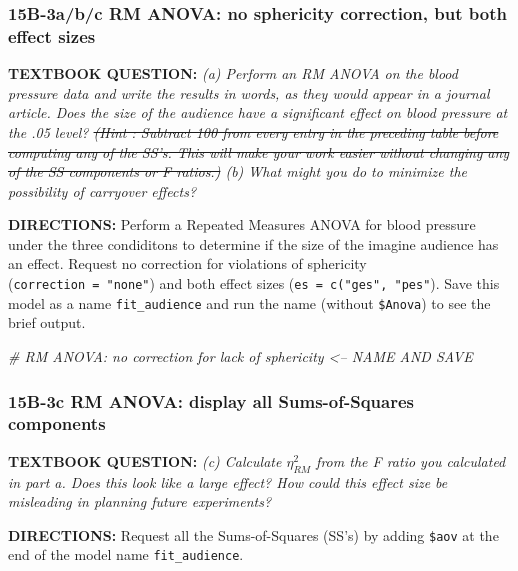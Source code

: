 \documentclass[]{article}
\newenvironment{Shaded}{\begin{snugshade}}{\end{snugshade}}
\newcommand{\CommentTok}[1]{\textcolor[rgb]{0.56,0.35,0.01}{\textit{#1}}}
\begin{document}
\clearpage

\subsubsection{15B-3a/b/c RM ANOVA: no sphericity correction, but both
effect
sizes}\label{b-3abc-rm-anova-no-sphericity-correction-but-both-effect-sizes}

\textbf{TEXTBOOK QUESTION:} \emph{(a) Perform an RM ANOVA on the blood
pressure data and write the results in words, as they would appear in a
journal article. Does the size of the audience have a significant effect
on blood pressure at the .05 level? \sout{(Hint : Subtract 100 from
every entry in the preceding table before computing any of the SS's.
This will make your work easier without changing any of the SS
components or F ratios.)} (b) What might you do to minimize the
possibility of carryover effects?}

\textbf{DIRECTIONS:} Perform a Repeated Measures ANOVA for blood
pressure under the three condiditons to determine if the size of the
imagine audience has an effect. Request no correction for violations of
sphericity (\texttt{correction\ =\ "none"}) and both effect sizes
(\texttt{es\ =\ c("ges",\ "pes"}). Save this model as a name
\texttt{fit\_audience} and run the name (without \texttt{\$Anova}) to
see the brief output.

\begin{Shaded}
\begin{Highlighting}[]
\CommentTok{# RM ANOVA: no correction for lack of sphericity  <-- NAME AND SAVE}
\end{Highlighting}
\end{Shaded}

\clearpage

\subsubsection{15B-3c RM ANOVA: display all Sums-of-Squares
components}\label{b-3c-rm-anova-display-all-sums-of-squares-components}

\textbf{TEXTBOOK QUESTION:} \emph{(c) Calculate \(\eta_{RM}^2\) from the
F ratio you calculated in part a. Does this look like a large effect?
How could this effect size be misleading in planning future
experiments?}

\textbf{DIRECTIONS:} Request all the Sums-of-Squares (SS's) by adding
\texttt{\$aov} at the end of the model name \texttt{fit\_audience}.
\end{document}
